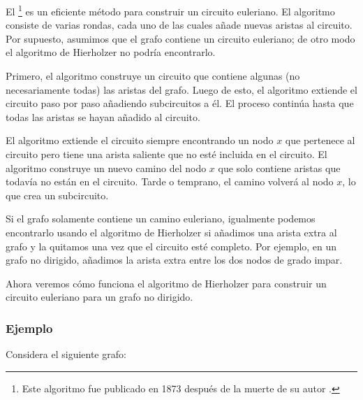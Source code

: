 
El \footnote{Este algoritmo fue publicado
    en 1873 después de la muerte de su autor \cite{hie73}.} es un
eficiente método para construir un circuito euleriano. El algoritmo
consiste de varias rondas, cada uno de las cuales añade nuevas aristas
al circuito. Por supuesto, asumimos que el grafo contiene un circuito
euleriano; de otro modo el algoritmo de Hierholzer no podría encontrarlo.

Primero, el algoritmo construye un circuito que contiene algunas
(no necesariamente todas) las aristas del grafo. Luego de esto, el
algoritmo extiende el circuito paso por paso añadiendo subcircuitos
a él. El proceso continúa hasta que todas las aristas se hayan
añadido al circuito.

El algoritmo extiende el circuito siempre encontrando un nodo $x$
que pertenece al circuito pero tiene una arista saliente que no esté
incluida en el circuito. El algoritmo construye un nuevo camino del
nodo $x$ que solo contiene aristas que todavía no están en el circuito.
Tarde o temprano, el camino volverá al nodo $x$, lo que crea un
subcircuito.

Si el grafo solamente contiene un camino euleriano, igualmente podemos
encontrarlo usando el algoritmo de Hierholzer si añadimos una arista
extra al grafo y la quitamos una vez que el circuito esté completo.
Por ejemplo, en un grafo no dirigido, añadimos la arista extra entre
los dos nodos de grado impar.

Ahora veremos cómo funciona el algoritmo de Hierholzer para construir
un circuito euleriano para un grafo no dirigido.

\subsubsection{Ejemplo}

Considera el siguiente grafo:
\begin{center}
\end{center}

